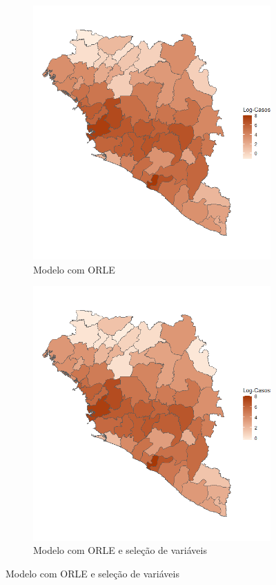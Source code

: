 \begin{figure}
\medskip
\begin{subfigure}{0.38\textwidth}
\includegraphics[width=\linewidth]{images/posterior_mean_orle.png}
\caption{Modelo com ORLE} \label{fig:c}
\end{subfigure}\hspace*{\fill}
\begin{subfigure}{0.38\textwidth}
\includegraphics[width=\linewidth]{images/posterior_mean_orle_ssvs.png}
\caption{Modelo com ORLE e seleção de variáveis} \label{fig:d}
\end{subfigure}


\end{figure}
